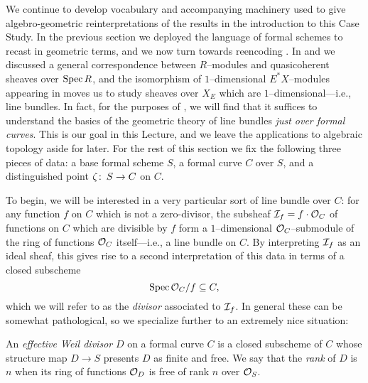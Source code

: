 We continue to develop vocabulary and accompanying machinery used to give algebro-geometric reinterpretations of the results in the introduction to this Case Study.  In the previous section we deployed the language of formal schemes to recast  in geometric terms, and we now turn towards reencoding .  In  and  we discussed a general correspondence between $R$--modules and quasicoherent sheaves over $\operatorname{Spec} R$, and the isomorphism of $1$--dimensional $E^* X$--modules appearing in  moves us to study sheaves over $X_E$ which are $1$--dimensional---i.e., line bundles.  In fact, for the purposes of , we will find that it suffices to understand the basics of the geometric theory of line bundles \emph{just over formal curves}.  This is our goal in this Lecture, and we leave the applications to algebraic topology aside for later.  For the rest of this section we fix the following three pieces of data: a base formal scheme $S$, a formal curve $C$ over $S$, and a distinguished point $\zeta\colon\thinspace S \to C$ on $C$.

To begin, we will be interested in a very particular sort of line bundle over $C$: for any function $f$ on $C$ which is not a zero-divisor, the subsheaf $\mathcal{I}_f = f \cdot \mathcal{O}_C$ of functions on $C$ which are divisible by $f$ form a $1$--dimensional $\mathcal{O}_C$--submodule of the ring of functions $\mathcal{O}_C$ itself---i.e., a line bundle on $C$.  By interpreting $\mathcal{I}_f$ as an ideal sheaf, this gives rise to a second interpretation of this data in terms of a closed subscheme \[\operatorname{Spec} \mathcal{O}_C / f \subseteq C,\] which we will refer to as the \textit{divisor} associated to $\mathcal{I}_f$.  In general these can be somewhat pathological, so we specialize further to an extremely nice situation:

\begin{definition}
An \textit{effective Weil divisor} $D$ on a formal curve $C$ is a closed subscheme of $C$ whose structure map $D \to S$ presents $D$ as finite and free.  We say that the \textit{rank} of $D$ is $n$ when its ring of functions $\mathcal{O}_D$ is free of rank $n$ over $\mathcal{O}_S$.
\end{definition}

